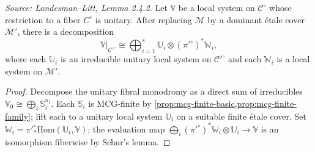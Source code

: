 \begin{lemma}
  \label{lem:tensor-product-unitary}
  \textit{Source: Landesman--Litt, Lemma 2.4.2.}
  Let $\mathbb{V}$ be a local system on $\mathcal{C}^\circ$ whose restriction
  to a fiber $C^\circ$ is unitary.
  After replacing $\mathcal{M}$ by a dominant \'{e}tale cover $\mathcal{M}'$,
  there is a decomposition
  \[
    \mathbb{V}|_{\mathcal{C}'^\circ}
    \cong \bigoplus_{i=1}^s \mathbb{U}_i \otimes (\pi'^\circ)^* \mathbb{W}_i,
  \]
  where each $\mathbb{U}_i$ is an irreducible unitary local system on
  $\mathcal{C}'^\circ$ and each $\mathbb{W}_i$ is a local system on
  $\mathcal{M}'$.
\end{lemma}

\begin{proof}
  Decompose the unitary fibral monodromy as a direct sum of irreducibles
  $\mathbb{V}_0 \cong \bigoplus_i \mathbb{S}_i^{n_i}$.
  Each $\mathbb{S}_i$ is MCG-finite by \cref{prop:mcg-finite-basic,prop:mcg-finite-family};
  lift each to a unitary local system $\mathbb{U}_i$ on a suitable finite
  \'{e}tale cover.
  Set $\mathbb{W}_i = \pi'^\circ_* \mathrm{Hom}(\mathbb{U}_i, \mathbb{V})$;
  the evaluation map $\bigoplus_i (\pi'^\circ)^* \mathbb{W}_i \otimes \mathbb{U}_i
  \to \mathbb{V}$ is an isomorphism fiberwise by Schur's lemma.
\end{proof}

